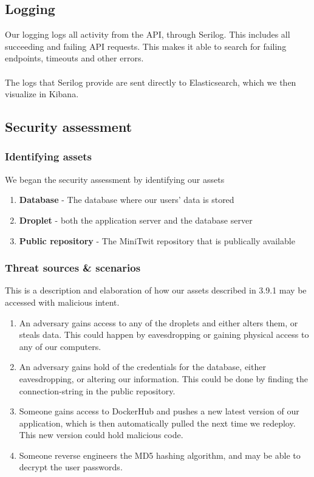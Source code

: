 \documentclass{article}
\begin{document}
\subsection{Logging}
Our logging logs all activity from the API, through Serilog. This includes all succeeding and failing API requests. This makes it able to search for failing endpoints, timeouts and other errors. 
\\\\
The logs that Serilog provide are sent directly to Elasticsearch, which we then visualize in Kibana. 

\subsection{Security assessment}
\subsubsection{Identifying assets}
We began the security assessment by identifying our assets
\begin{enumerate}
    \item \textbf{Database} - The database where our users' data is stored
    \item \textbf{Droplet} - both the application server and the database server
    \item \textbf{Public repository} - The MiniTwit repository that is publically available
\end{enumerate}

\subsubsection{Threat sources \& scenarios}
This is a description and elaboration of how our assets described in 3.9.1 may be accessed with malicious intent.
\begin{enumerate}
    \item An adversary gains access to any of the droplets and either alters them, or steals data. This could happen by eavesdropping or gaining physical access to any of our computers.
    \item An adversary gains hold of the credentials for the database, either eavesdropping, or altering our information. This could be done by finding the connection-string in the public repository.
    \item Someone gains access to DockerHub and pushes a new latest version of our application, which is then automatically pulled the next time we redeploy. This new version could hold malicious code.
    \item Someone reverse engineers the MD5 hashing algorithm, and may be able to decrypt the user passwords.
\end{enumerate}
\end{document}
